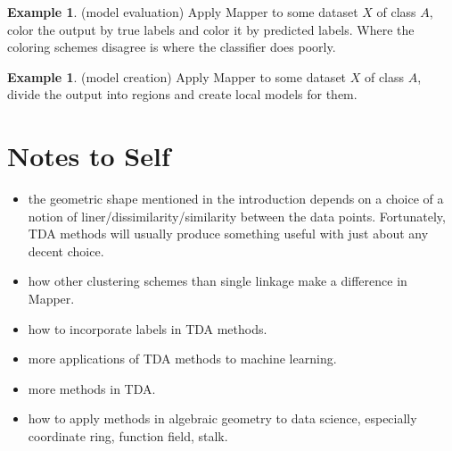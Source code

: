 \documentclass[12pt]{amsart}
\theoremstyle{definition}
\newtheorem{example}[theorem]{Example}
\begin{document}
\begin{example} (model evaluation) Apply Mapper to some dataset $X$ of class $A$, color the output by true labels and color it by predicted labels. Where the coloring schemes disagree is where the classifier does poorly.
\end{example}

\begin{example} (model creation) Apply Mapper to some dataset $X$ of class $A$, divide the output into regions and create local models for them.
\end{example}

\section{Notes to Self}
\begin{itemize}
\item the geometric shape mentioned in the introduction depends on a choice of a notion of liner/dissimilarity/similarity between the data points. Fortunately, TDA methods will usually produce something useful with just about any decent choice.
\item how other clustering schemes than single linkage make a difference in Mapper.
\item how to incorporate labels in TDA methods.
\item more applications of TDA methods to machine learning.
\item more methods in TDA.
\item how to apply methods in algebraic geometry to data science, especially coordinate ring, function field, stalk.
\end{itemize}


\newpage
\begin{bibdiv}
\begin{biblist}
\end{biblist}
\end{bibdiv}
\end{document}
